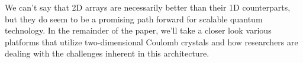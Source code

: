 We can't say that 2D arrays are necessarily better than their 1D counterparts, but they do seem to be a promising path forward for scalable quantum technology. In the remainder of the paper, we'll take a closer look various platforms that utilize two-dimensional Coulomb crystals and how researchers are dealing with the challenges inherent in this architecture.